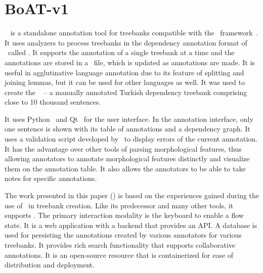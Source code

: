 \section{BoAT-v1}
\label{sec:boatvone}

\boatvone~\cite{turk-etal-2019-turkish} is a standalone annotation tool for treebanks compatible with the \ud\ framework~\cite{UD}.
It uses analyzers to process treebanks in the dependency annotation format of \ud\ called \conllu.
It supports the annotation of a single treebank at a time and the annotations are stored in a \conllu\ file, which is updated as annotations are made.
It is useful in agglutinative language annotation due to its feature of splitting and joining lemmas, but it can be used for other languages as well.
It was used to create the \bountreebank~\cite{turk-etal-2019-turkish,turk2021resources,UD-Boun-Treebank} -- a manually annotated Turkish dependency treebank comprising close to 10 thousand sentences.

It uses Python~\cite{python} and Qt~\cite{qt} for the user interface.
In the annotation interface, only one sentence is shown with its table of annotations and a dependency graph.
It uses a validation script developed by \ud\ to display errors of the current annotation.
It has the advantage over other tools of parsing morphological features, thus allowing annotators to annotate morphological features distinctly and visualize them on the annotation table.
It also allows the annotators to be able to take notes for specific annotations.

The work presented in this paper (\boatvtwo) is based on the experiences gained during the use of \boatvone\ in treebank creation.
Like its predecessor and many other tools, it supports \ud.
The primary interaction modality is the keyboard to enable a flow state.
It is a web application with a backend that provides an API.
A database is used for persisting the annotations created by various annotators for various treebanks.
It provides rich search functionality that supports collaborative annotations.
It is an open-source resource that is containerized for ease of distribution and deployment.
